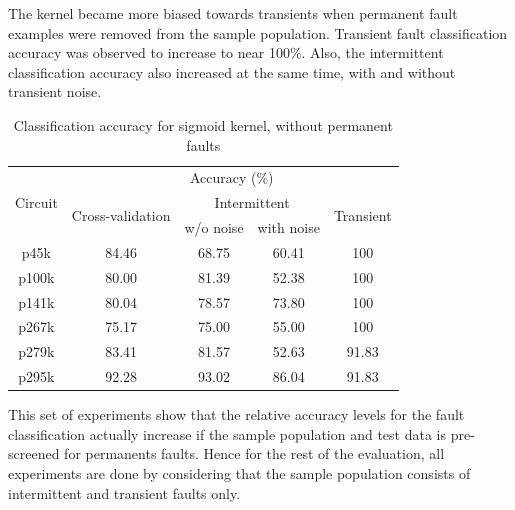 The kernel became more biased towards transients when permanent fault examples were removed from the sample population. Transient fault classification accuracy was observed to increase to near 100\%. Also, the intermittent classification accuracy also increased at the same time, with and without transient noise.

\begin{table}[h]
\captionsetup{justification=centering}
\begin{tabular}{ccccc}
\hline
\multirow{3}{*}{Circuit} & \multicolumn{4}{c}{Accuracy (\%)}                                                                 \\ \cline{2-5} 
                         & \multirow{2}{*}{Cross-validation} & \multicolumn{2}{c}{Intermittent} & \multirow{2}{*}{Transient} \\ \cline{3-4}
                         &                                   & w/o noise      & with noise      &                            \\ \hline
p45k                     & 84.46                             & 68.75          & 60.41           & 100                        \\
p100k                    & 80.00                             & 81.39          & 52.38           & 100                        \\
p141k                    & 80.04                             & 78.57          & 73.80           & 100                        \\
p267k                    & 75.17                             & 75.00          & 55.00           & 100                        \\
p279k                    & 83.41                             & 81.57          & 52.63           & 91.83                      \\
p295k                    & 92.28                             & 93.02          & 86.04           & 91.83                     \\
\hline
\end{tabular}
\caption {Classification accuracy for sigmoid kernel, without permanent faults}
\label{tab:sigwop}
\end{table}

This set of experiments show that the relative accuracy levels for the fault classification actually increase if the sample population and test data is pre-screened for permanents faults. Hence for the rest of the evaluation,  all experiments are done by considering that the sample population consists of intermittent and transient faults only.

